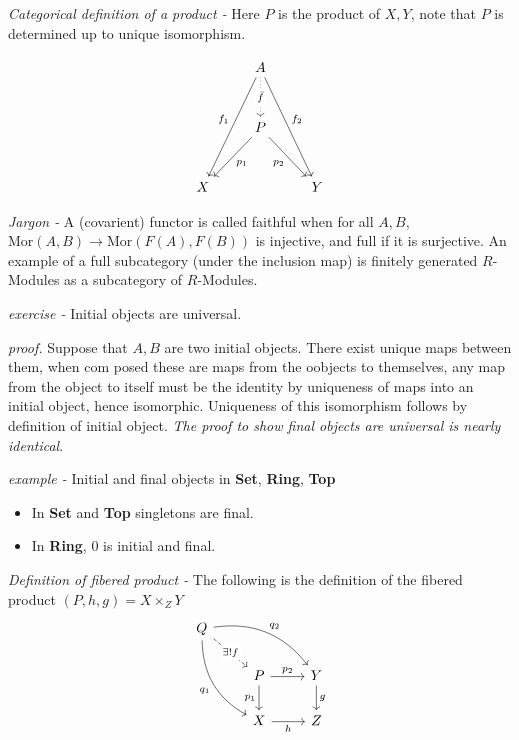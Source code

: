 \documentclass[11pt]{article}
\theoremstyle{definition}
\newcommand{\mor}{\text{Mor}}
\begin{document}
    \emph{Categorical definition of a product -} Here \(P\) is the product of \(X,Y\), note that \(P\) is determined up to unique isomorphism.

    \begin{equation*}
        \begin{tikzcd}[row sep=1cm]
            &A\arrow[ddl,"f_1"']\arrow[ddr,"f_2"]\arrow[d,dotted,"\bar{f}" description]\\
            &P\arrow[dl,"p_1"]\arrow[dr,"p_2"']\\
            X&&Y
          \end{tikzcd}
    \end{equation*}

    \emph{Jargon - } A (covarient) functor is called faithful when for all \(A,B\), \(\mor(A,B) \to \mor(F(A),F(B))\) is injective, and full if it is surjective.
    An example of a full subcategory (under the inclusion map) is finitely generated \(R\)-Modules as a subcategory of \(R\)-Modules.

    \emph{exercise - } Initial objects are universal. 
    
    \emph{proof.} Suppose that \(A, B\) are two initial objects. There exist unique maps between them, when com posed these are maps from the oobjects to themselves, any map from the object to itself must be the identity by uniqueness of maps into an initial object, hence isomorphic. Uniqueness of this isomorphism follows by definition of initial object. \emph{The proof to show final objects are universal is nearly identical}.

    \emph{example - } Initial and final objects in \textbf{Set}, \textbf{Ring}, \textbf{Top}

    \begin{itemize}
        \item In \textbf{Set} and \textbf{Top} singletons are final.
        \item In \textbf{Ring}, \(0\) is initial and final.
    \end{itemize}

    \emph{Definition of fibered product - } The following is the definition of the fibered product \((P,h,g) = X \times_Z Y\)
    \begin{equation*}
        \begin{tikzcd}
            Q
            \arrow[bend left]{drr}{q_2}
            \arrow[bend right,swap]{ddr}{q_1}
            \arrow[dashed]{dr}[description]{\exists ! f} & & \\
            & P \arrow{r}{p_2} \arrow{d}[swap]{p_1}
            & Y \arrow{d}{g} \\
            & X \arrow[swap]{r}{h}
            & Z
            \end{tikzcd}
    \end{equation*}
\end{document}
